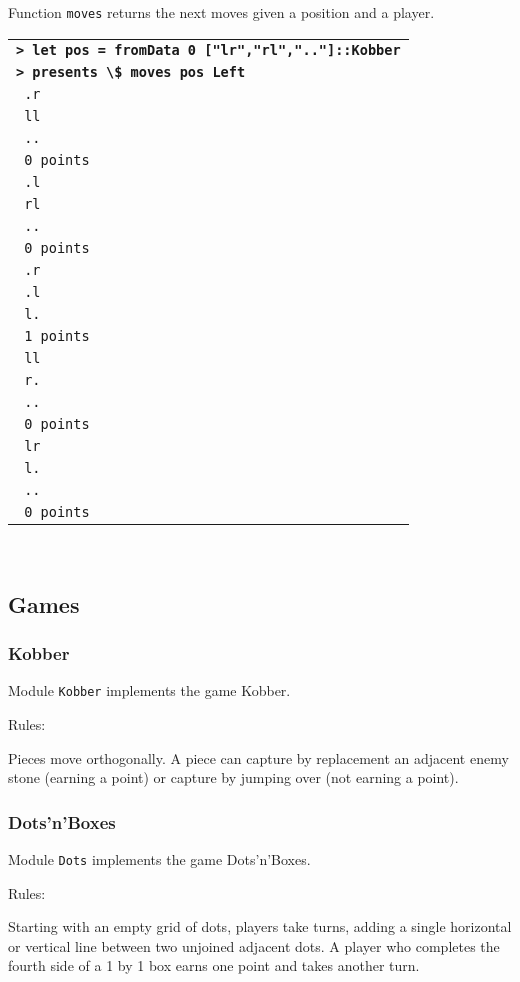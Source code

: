 \documentclass[a4paper,12pt]{article}
\newcommand{\bash}[1]{\small\textbf{\lstinline§> #1§}\\}
\newcommand{\out}[1]{\small\lstinline§ #1§}
\newcommand{\haskellCode}{\fontfamily{pcr}\selectfont}
\newenvironment{sgcode}
	{ \haskellCode
	  \begin{tabular}{|p{0.9\textwidth}|}
      \hline	
	}
	{ \\\hline  
      \end{tabular} \\
	  \par 
	}
\begin{document}
Function \verb!moves! returns the next moves given a position and a player.

\begin{sgcode}
\bash{let pos = fromData 0 ["lr","rl",".."]::Kobber}
\bash{presents \$ moves pos Left}
\out{.r} \\
\out{ll} \\
\out{..} \\
\out{0 points} \\
\out{.l} \\
\out{rl} \\
\out{..} \\
\out{0 points} \\
\out{.r} \\
\out{.l} \\
\out{l.} \\
\out{1 points} \\
\out{ll} \\
\out{r.} \\
\out{..} \\
\out{0 points} \\
\out{lr} \\
\out{l.} \\
\out{..} \\
\out{0 points} 
\end{sgcode}

\subsection{Games}

\subsubsection{Kobber}

Module \verb|Kobber| implements the game Kobber.

Rules:

Pieces move orthogonally. 
A piece can capture by replacement an adjacent enemy stone (earning a point) or 
capture by jumping over (not earning a point).

\subsubsection{Dots'n'Boxes}

Module \verb|Dots| implements the game Dots'n'Boxes.

Rules:

Starting with an empty grid of dots, players take turns, adding a single horizontal 
or vertical line between two unjoined adjacent dots. A player who completes the 
fourth side of a 1 by 1 box earns one point and takes another turn. 
\end{document}

